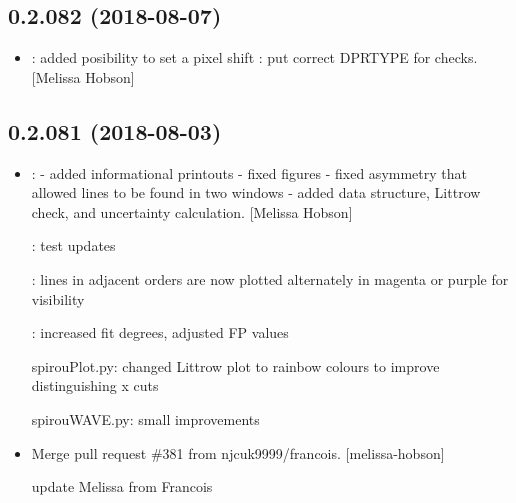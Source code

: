 \documentclass[a4paper,10pt,english]{report}
\begin{document}
\subsection{0.2.082 (2018-08-07)}
\label{\detokenize{misc/changelog:id380}}\begin{itemize}
\item {} 
: added posibility to set a pixel shift
: put correct DPRTYPE for  checks. {[}Melissa
Hobson{]}

\end{itemize}


\subsection{0.2.081 (2018-08-03)}
\label{\detokenize{misc/changelog:id381}}\begin{itemize}
\item {} 
: - added informational printouts - fixed
figures - fixed asymmetry that allowed lines to be found in two
windows - added  data structure, Littrow check, and
uncertainty calculation. {[}Melissa Hobson{]}

: test updates

: lines in adjacent orders are now plotted alternately in magenta or purple for visibility

: increased fit degrees, adjusted FP values

spirouPlot.py: changed Littrow plot to rainbow colours to improve distinguishing x cuts

spirouWAVE.py: small improvements

\item {} 
Merge pull request \#381 from njcuk9999/francois. {[}melissa-hobson{]}

update Melissa from Francois

\end{itemize}
\end{document}
